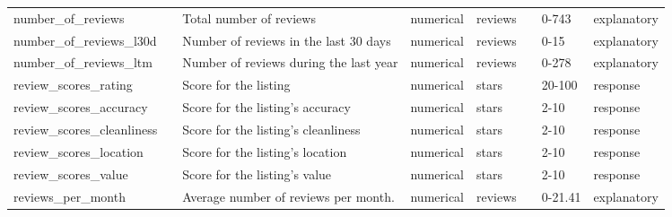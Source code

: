 \begin{center}
\begin{xltabular}{\textwidth}{llXlllll}
number\_of\_reviews         &                             & Total number of reviews & numerical   & reviews        &                             &                     0-743   & explanatory \\
number\_of\_reviews\_l30d   &                             & Number of reviews in the last 30 days & numerical   & reviews        &                             &                     0-15    & explanatory \\
number\_of\_reviews\_ltm     &                             & Number of reviews during the last year & numerical   & reviews        &                             &                     0-278   & explanatory \\
review\_scores\_rating       &                             & Score for the listing & numerical   & stars          &                             &                     20-100  & response \\
review\_scores\_accuracy     &                             & Score for the listing's accuracy & numerical   & stars          &                             &                     2-10    & response \\
review\_scores\_cleanliness  &                             & Score for the listing's cleanliness & numerical   & stars          &                             &                     2-10    & response \\
review\_scores\_location     &                             & Score for the listing's location & numerical   & stars          &                             &                     2-10    & response \\
review\_scores\_value        &                             & Score for the listing's value & numerical   & stars          &                             &                     2-10    & response \\
reviews\_per\_month         &                             & Average number of reviews per month. & numerical   & reviews        &                             &                     0-21.41 & explanatory
\end{xltabular}

\end{center}
